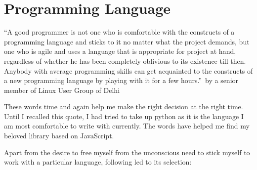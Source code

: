 \section {Programming Language}
\label{sec:javascript}
\smallskip
{\textquotedblleft A good programmer is not one who is comfortable with the constructs of a programming language and sticks to it no matter what the project demands, but one who is agile and uses a language that is appropriate for project at hand, regardless of whether he has been completely oblivious to its existence till then. Anybody with average programming skills can get acquainted to the constructs of a new programming language by playing with it for a few hours.\textquotedblright \ by a senior member of Linux User Group of Delhi}\par \bigskip 
These words time and again help me make the right decision at the right time. Until I recalled this quote, I had tried to take up python as it is the language I am most comfortable to write with currently. The words have helped me find my beloved library based on JavaScript.\par \medskip
Apart from the desire to free myself from the unconscious need to stick myself to work with a particular language, following led to its selection:
